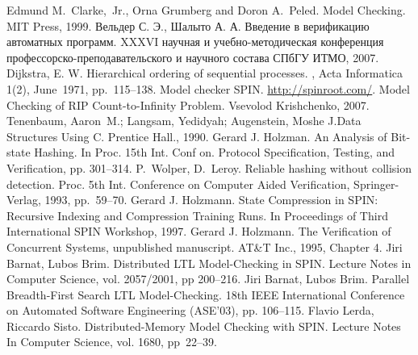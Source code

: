 \begin{thebibliography}{99}

 Edmund M.~Clarke,~Jr., Orna Grumberg and Doron A.~Peled. Model
  Checking. MIT Press, 1999.
 Вельдер С. Э., Шалыто А. А. Введение в верификацию автоматных
  программ. XXXVI научная и учебно-методическая конференция
  профессорско-преподавательского и научного состава СПбГУ ИТМО, 2007.
 Dijkstra, E. W. Hierarchical ordering of sequential processes. , Acta
  Informatica 1(2), June~1971, pp.~115--138.
 Model checker SPIN. \url{http://spinroot.com/}.
 Model Checking of RIP Count-to-Infinity Problem. Vsevolod Krishchenko,
  2007.
 Tenenbaum, Aaron~M.; Langsam, Yedidyah; Augenstein, Moshe J.Data
  Structures Using C. Prentice Hall., 1990.
 Gerard J. Holzman. An Analysis of Bit-state Hashing. In Proc. 15th
  Int. Conf on. Protocol Specification, Testing, and Verification, pp. 301--314.
 P.~Wolper, D.~Leroy. Reliable hashing without collision
  detection. Proc. 5th Int. Conference on Computer Aided Verification, Springer-Verlag,
  1993, pp.~59--70.
 Gerard J. Holzmann. State Compression in SPIN: Recursive Indexing and
  Compression Training Runs. In Proceedings of Third International SPIN Workshop, 1997.
 Gerard J. Holzmann. The Verification of Concurrent Systems, unpublished
  manuscript. AT\&T Inc., 1995, Chapter 4.
 Jiri Barnat, Lubos Brim. Distributed LTL Model-Checking in SPIN. Lecture
  Notes in Computer Science, vol. 2057/2001, pp 200--216.
 Jiri Barnat, Lubos Brim. Parallel Breadth-First Search LTL
  Model-Checking. 18th IEEE International Conference on Automated Software Engineering
  (ASE'03), pp. 106--115.
 Flavio Lerda, Riccardo Sisto. Distributed-Memory Model Checking with
  SPIN. Lecture Notes In Computer Science, vol. 1680, pp~22--39.
\end{thebibliography}

